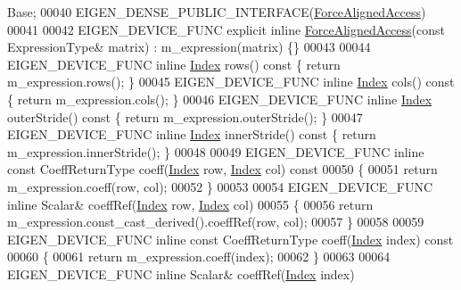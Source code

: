 \begin{DoxyCode}
       Base;
00040     EIGEN\_DENSE\_PUBLIC\_INTERFACE(\hyperlink{group___core___module_class_eigen_1_1_force_aligned_access}{ForceAlignedAccess})
00041 
00042     EIGEN\_DEVICE\_FUNC \textcolor{keyword}{explicit} \textcolor{keyword}{inline} \hyperlink{group___core___module_class_eigen_1_1_force_aligned_access}{ForceAlignedAccess}(\textcolor{keyword}{const} ExpressionType& matrix) : 
      m\_expression(matrix) \{\}
00043 
00044     EIGEN\_DEVICE\_FUNC \textcolor{keyword}{inline} \hyperlink{namespace_eigen_a62e77e0933482dafde8fe197d9a2cfde}{Index} rows()\textcolor{keyword}{ const }\{ \textcolor{keywordflow}{return} m\_expression.rows(); \}
00045     EIGEN\_DEVICE\_FUNC \textcolor{keyword}{inline} \hyperlink{namespace_eigen_a62e77e0933482dafde8fe197d9a2cfde}{Index} cols()\textcolor{keyword}{ const }\{ \textcolor{keywordflow}{return} m\_expression.cols(); \}
00046     EIGEN\_DEVICE\_FUNC \textcolor{keyword}{inline} \hyperlink{namespace_eigen_a62e77e0933482dafde8fe197d9a2cfde}{Index} outerStride()\textcolor{keyword}{ const }\{ \textcolor{keywordflow}{return} m\_expression.outerStride(); \}
00047     EIGEN\_DEVICE\_FUNC \textcolor{keyword}{inline} \hyperlink{namespace_eigen_a62e77e0933482dafde8fe197d9a2cfde}{Index} innerStride()\textcolor{keyword}{ const }\{ \textcolor{keywordflow}{return} m\_expression.innerStride(); \}
00048 
00049     EIGEN\_DEVICE\_FUNC \textcolor{keyword}{inline} \textcolor{keyword}{const} CoeffReturnType coeff(\hyperlink{namespace_eigen_a62e77e0933482dafde8fe197d9a2cfde}{Index} row, \hyperlink{namespace_eigen_a62e77e0933482dafde8fe197d9a2cfde}{Index} col)\textcolor{keyword}{ const}
00050 \textcolor{keyword}{    }\{
00051       \textcolor{keywordflow}{return} m\_expression.coeff(row, col);
00052     \}
00053 
00054     EIGEN\_DEVICE\_FUNC \textcolor{keyword}{inline} Scalar& coeffRef(\hyperlink{namespace_eigen_a62e77e0933482dafde8fe197d9a2cfde}{Index} row, \hyperlink{namespace_eigen_a62e77e0933482dafde8fe197d9a2cfde}{Index} col)
00055     \{
00056       \textcolor{keywordflow}{return} m\_expression.const\_cast\_derived().coeffRef(row, col);
00057     \}
00058 
00059     EIGEN\_DEVICE\_FUNC \textcolor{keyword}{inline} \textcolor{keyword}{const} CoeffReturnType coeff(\hyperlink{namespace_eigen_a62e77e0933482dafde8fe197d9a2cfde}{Index} index)\textcolor{keyword}{ const}
00060 \textcolor{keyword}{    }\{
00061       \textcolor{keywordflow}{return} m\_expression.coeff(index);
00062     \}
00063 
00064     EIGEN\_DEVICE\_FUNC \textcolor{keyword}{inline} Scalar& coeffRef(\hyperlink{namespace_eigen_a62e77e0933482dafde8fe197d9a2cfde}{Index} index)

\end{DoxyCode}
